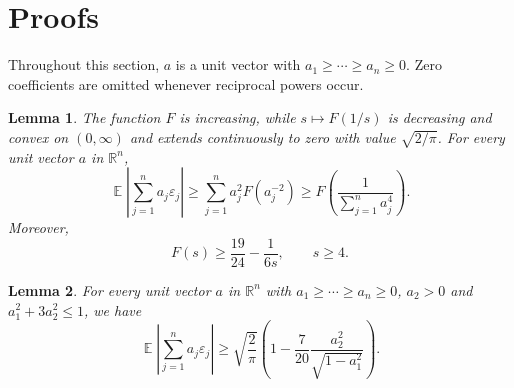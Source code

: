 \documentclass[a4paper,twoside,11pt,reqno]{amsart}
\newtheorem{lemma}{Lemma}
\theoremstyle{definition}
\theoremstyle{remark}
\newcommand{\1}{\mathbbm{1}}
\newcommand{\R}{\mathbb{R}}
\DeclareMathOperator{\E}{\mathbb{E}}
\def \R {\mathbb{R}}
\begin{document}
\section{Proofs}\label{sec:proofs}
Throughout this section, $a$ is a unit vector with $a_1\ge\cdots\ge a_n\ge0$. Zero coefficients are omitted whenever reciprocal powers occur.

\begin{lemma}\label{lem:F}
The function $F$ is increasing, while $s\mapsto F(1/s)$ is decreasing and convex on $(0,\infty)$ and extends continuously to zero with value $\sqrt{2/\pi}$. For every unit vector $a$ in $\R^n$,
\begin{equation}\label{eq:Haagerup}
 \E\left|\sum_{j=1}^n a_j\varepsilon_j\right|
 \ge\sum_{j=1}^n a_j^2F(a_j^{-2})
 \ge F\!\left(\frac1{\sum_{j=1}^n a_j^4}\right).
\end{equation}
Moreover,
\begin{equation}\label{eq:scalar}
 F(s)\ge\frac{19}{24}-\frac1{6s},\qquad s\ge4.
\end{equation}
\end{lemma}

\begin{lemma}\label{lem:tail}
For every unit vector $a$ in $\R^n$ with $a_1\ge\cdots\ge a_n\ge0$, $a_2>0$ and $a_1^2+3a_2^2\le1$, we have
\begin{equation}\label{eq:tail}
 \E\left|\sum_{j=1}^n a_j\varepsilon_j\right|
 \ge\sqrt{\frac2\pi}\left(1-\frac7{20}\frac{a_2^2}{\sqrt{1-a_1^2}}\right).
\end{equation}
\end{lemma}
\end{document}

